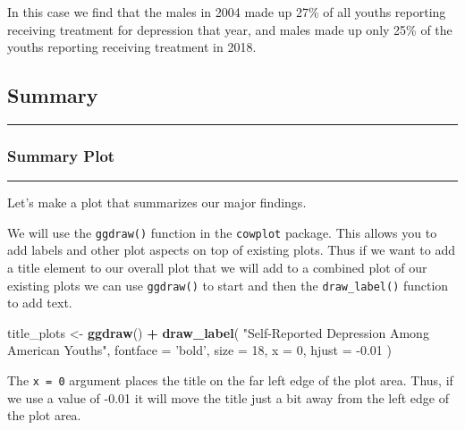 \documentclass[
]{article}
\newenvironment{Shaded}{\begin{snugshade}}{\end{snugshade}}
\newcommand{\DataTypeTok}[1]{\textcolor[rgb]{0.13,0.29,0.53}{#1}}
\newcommand{\DecValTok}[1]{\textcolor[rgb]{0.00,0.00,0.81}{#1}}
\newcommand{\FloatTok}[1]{\textcolor[rgb]{0.00,0.00,0.81}{#1}}
\newcommand{\KeywordTok}[1]{\textcolor[rgb]{0.13,0.29,0.53}{\textbf{#1}}}
\newcommand{\NormalTok}[1]{#1}
\newcommand{\OperatorTok}[1]{\textcolor[rgb]{0.81,0.36,0.00}{\textbf{#1}}}
\newcommand{\StringTok}[1]{\textcolor[rgb]{0.31,0.60,0.02}{#1}}
\begin{document}
In this case we find that the males in 2004 made up 27\% of all youths
reporting receiving treatment for depression that year, and males made
up only 25\% of the youths reporting receiving treatment in 2018.

\hypertarget{summary}{%
\subsection{\texorpdfstring{\textbf{Summary}}{Summary}}\label{summary}}

\begin{center}\rule{0.5\linewidth}{0.5pt}\end{center}

\hypertarget{summary-plot}{%
\subsubsection{\texorpdfstring{\textbf{Summary
Plot}}{Summary Plot}}\label{summary-plot}}

\begin{center}\rule{0.5\linewidth}{0.5pt}\end{center}

Let's make a plot that summarizes our major findings.

We will use the \texttt{ggdraw()} function in the \texttt{cowplot}
package. This allows you to add labels and other plot aspects on top of
existing plots. Thus if we want to add a title element to our overall
plot that we will add to a combined plot of our existing plots we can
use \texttt{ggdraw()} to start and then the \texttt{draw\_label()}
function to add text.

\begin{Shaded}
\begin{Highlighting}[]
\NormalTok{title_plots <-}
\StringTok{  }\KeywordTok{ggdraw}\NormalTok{() }\OperatorTok{+}
\StringTok{  }\KeywordTok{draw_label}\NormalTok{(}
    \StringTok{"Self-Reported Depression Among American Youths"}\NormalTok{,}
    \DataTypeTok{fontface =} \StringTok{'bold'}\NormalTok{,}
    \DataTypeTok{size =} \DecValTok{18}\NormalTok{,}
    \DataTypeTok{x =} \DecValTok{0}\NormalTok{,}
    \DataTypeTok{hjust =} \FloatTok{-0.01}
\NormalTok{  )}
\end{Highlighting}
\end{Shaded}

The \texttt{x\ =\ 0} argument places the title on the far left edge of
the plot area. Thus, if we use a value of -0.01 it will move the title
just a bit away from the left edge of the plot area.
\end{document}

